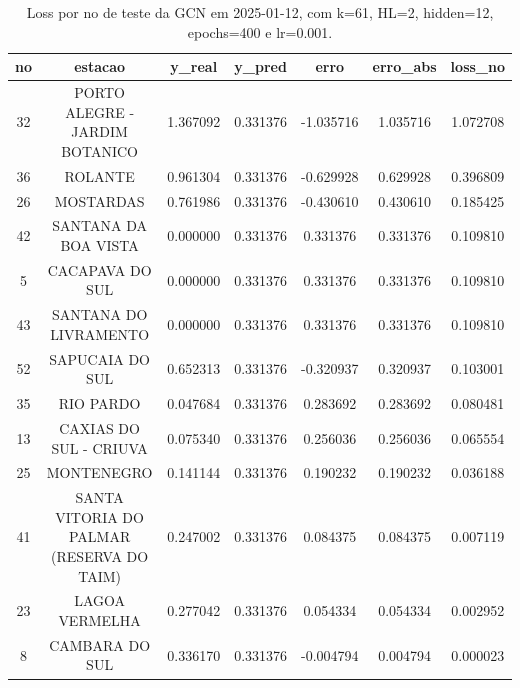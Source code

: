 \begin{table}[h]
\centering
\caption{Loss por no de teste da GCN em 2025-01-12, com k=61, HL=2, hidden=12, epochs=400 e lr=0.001.}
\label{tab:gcn_loss_k61_hl2_h12_e400_d20250112}
\begin{tabular}{ccccccc}
\toprule
no & estacao & y\_real & y\_pred & erro & erro\_abs & loss\_no \\
\midrule
32 & PORTO ALEGRE - JARDIM BOTANICO & 1.367092 & 0.331376 & -1.035716 & 1.035716 & 1.072708 \\
36 & ROLANTE & 0.961304 & 0.331376 & -0.629928 & 0.629928 & 0.396809 \\
26 & MOSTARDAS & 0.761986 & 0.331376 & -0.430610 & 0.430610 & 0.185425 \\
42 & SANTANA DA BOA VISTA & 0.000000 & 0.331376 & 0.331376 & 0.331376 & 0.109810 \\
5 & CACAPAVA DO SUL & 0.000000 & 0.331376 & 0.331376 & 0.331376 & 0.109810 \\
43 & SANTANA DO LIVRAMENTO & 0.000000 & 0.331376 & 0.331376 & 0.331376 & 0.109810 \\
52 & SAPUCAIA DO SUL & 0.652313 & 0.331376 & -0.320937 & 0.320937 & 0.103001 \\
35 & RIO PARDO & 0.047684 & 0.331376 & 0.283692 & 0.283692 & 0.080481 \\
13 & CAXIAS DO SUL - CRIUVA & 0.075340 & 0.331376 & 0.256036 & 0.256036 & 0.065554 \\
25 & MONTENEGRO & 0.141144 & 0.331376 & 0.190232 & 0.190232 & 0.036188 \\
41 & SANTA VITORIA DO PALMAR (RESERVA DO TAIM) & 0.247002 & 0.331376 & 0.084375 & 0.084375 & 0.007119 \\
23 & LAGOA VERMELHA & 0.277042 & 0.331376 & 0.054334 & 0.054334 & 0.002952 \\
8 & CAMBARA DO SUL & 0.336170 & 0.331376 & -0.004794 & 0.004794 & 0.000023 \\
\bottomrule
\end{tabular}
\end{table}
